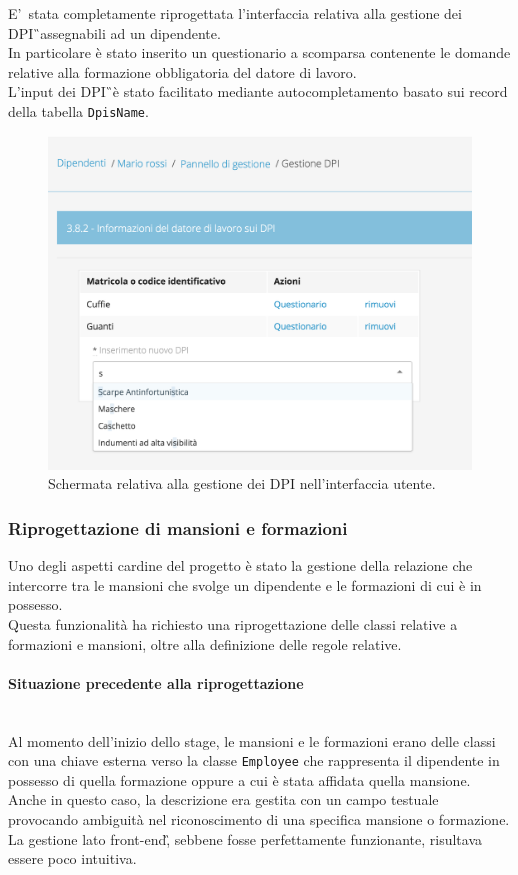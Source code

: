 E'\ stata completamente riprogettata l'interfaccia relativa alla gestione dei \gls{DPI}\G\ assegnabili ad un dipendente.\\
In particolare è stato inserito un questionario a scomparsa contenente le domande relative alla formazione obbligatoria del datore di lavoro. \\
L'input dei \gls{DPI}\G\ è stato facilitato mediante autocompletamento basato sui record della tabella \texttt{DpisName}.
\begin{figure}[H]
	\begin{center}
		\includegraphics[width=12cm]{Pics/ScreenDPI.png}
		\caption{Schermata relativa alla gestione dei DPI nell'interfaccia utente.}
		\label{fig:ScreenDPI}
	\end{center}
\end{figure}

\newpage
\subsubsection{Riprogettazione di mansioni e formazioni}
Uno degli aspetti cardine del progetto è stato la gestione della relazione che intercorre tra le mansioni che svolge un dipendente e le formazioni di cui è in possesso.\\
Questa funzionalità ha richiesto una riprogettazione delle classi relative a formazioni e mansioni, oltre alla definizione delle regole relative.\\


\paragraph*{Situazione precedente alla riprogettazione} \mbox{} \\
	Al momento dell'inizio dello stage, le mansioni e le formazioni erano delle classi con una chiave esterna verso la classe \texttt{Employee} che rappresenta il dipendente in possesso di quella formazione oppure a cui è stata affidata quella mansione.\\
	Anche in questo caso, la descrizione era gestita con un campo testuale provocando ambiguità nel riconoscimento di una specifica mansione o formazione.\\
	La gestione lato \gls{front-end}\G, sebbene fosse perfettamente funzionante, risultava essere poco intuitiva.
	
